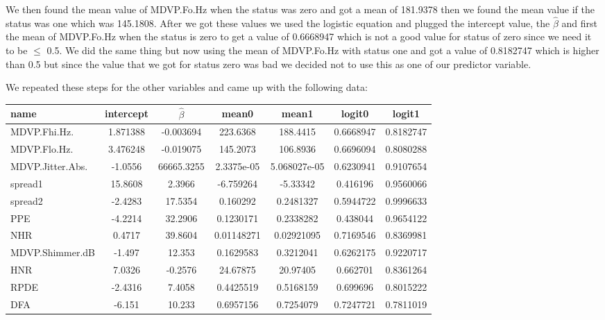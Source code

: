 \documentclass{article}
\begin{document}
We then found the mean value of MDVP.Fo.Hz when the status was zero and got a mean of
181.9378 then we found the mean value if the status was one which was 145.1808. After
we got these values we used the logistic equation and plugged the intercept value, the
$\hat{\beta}$ and first the mean of MDVP.Fo.Hz when the status is zero to get a value of
0.6668947 which is not a good value for status of zero since we need it to be $\leq$ 0.5.
We did the same thing but now using the mean of MDVP.Fo.Hz with status one and got
a value of 0.8182747 which is higher than 0.5 but since the value that we got for
status zero was bad we decided not to use this as one of our predictor variable.

We repeated these steps for the other variables and came up with the following data:

\begin{table}[h]
  \centering
\begin{tabular}{|l|c|c|c|c|c|c|}
\hline
name & intercept & $\hat{\beta}$ & mean0 & mean1 & logit0 & logit1 \\
\hline
MDVP.Fhi.Hz. & 1.871388 & -0.003694 & 223.6368 & 188.4415 & 0.6668947 & 0.8182747 \\
\hline
MDVP.Flo.Hz. & 3.476248 & -0.019075 & 145.2073 & 106.8936 & 0.6696094 & 0.8080288 \\
\hline
MDVP.Jitter.Abs. & -1.0556 & 66665.3255 & 2.3375e-05 & 5.068027e-05 & 0.6230941 & 0.9107654 \\
\hline
spread1 & 15.8608 & 2.3966 & -6.759264 & -5.33342 & 0.416196 & 0.9560066 \\
\hline
spread2 & -2.4283 & 17.5354 & 0.160292 & 0.2481327 & 0.5944722 & 0.9996633 \\
\hline
PPE & -4.2214 & 32.2906 & 0.1230171 & 0.2338282 & 0.438044 & 0.9654122 \\
\hline
NHR & 0.4717 & 39.8604 & 0.01148271 & 0.02921095 & 0.7169546 & 0.8369981 \\
\hline
MDVP.Shimmer.dB & -1.497 & 12.353 & 0.1629583 & 0.3212041 & 0.6262175 & 0.9220717 \\
\hline
HNR & 7.0326 & -0.2576 & 24.67875 & 20.97405 & 0.662701 & 0.8361264 \\
\hline
RPDE & -2.4316 & 7.4058 & 0.4425519 & 0.5168159 & 0.699696 & 0.8015222 \\
\hline
DFA & -6.151 & 10.233 & 0.6957156 & 0.7254079 & 0.7247721 & 0.7811019 \\
\hline
\end{tabular}
\end{table}
\end{document}
